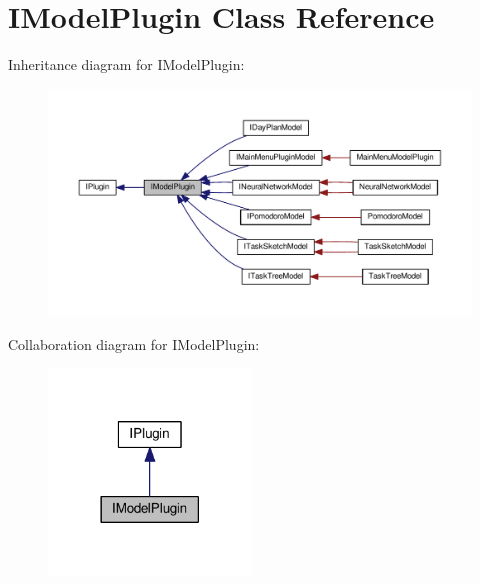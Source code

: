 \hypertarget{class_i_model_plugin}{}\section{I\+Model\+Plugin Class Reference}
\label{class_i_model_plugin}


Inheritance diagram for I\+Model\+Plugin\+:\nopagebreak
\begin{figure}[H]
\begin{center}
\leavevmode
\includegraphics[width=350pt]{class_i_model_plugin__inherit__graph}
\end{center}
\end{figure}


Collaboration diagram for I\+Model\+Plugin\+:\nopagebreak
\begin{figure}[H]
\begin{center}
\leavevmode
\includegraphics[width=153pt]{class_i_model_plugin__coll__graph}
\end{center}
\end{figure}
